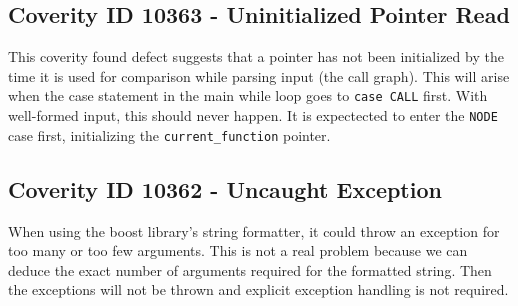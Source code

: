 \documentclass[12pt]{article}
\begin{document}
\subsection{Coverity ID 10363 - Uninitialized Pointer Read}
This coverity found defect suggests that a pointer has not been initialized by the time it is used for comparison while parsing input (the call graph). This will arise when the case statement in the main while loop goes to \texttt{case CALL} first. With well-formed input, this should never happen. It is expectected to enter the \texttt{NODE} case first, initializing the \texttt{current\_function} pointer.

\subsection{Coverity ID 10362 - Uncaught Exception}
When using the boost library's string formatter, it could throw an exception for too many or too few arguments. This is not a real problem because we can deduce the exact number of arguments required for the formatted string. Then the exceptions will not be thrown and explicit exception handling is not required.
\end{document}
